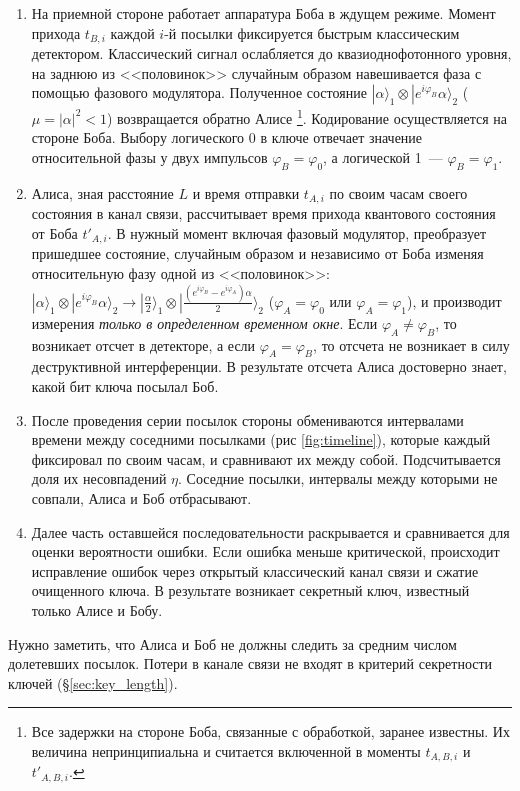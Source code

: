 \begin{enumerate}
  \item На приемной стороне работает аппаратура Боба в ждущем режиме. Момент прихода $t_{B,i}$ каждой $i$-й посылки фиксируется быстрым классическим детектором. 
  Классический сигнал ослабляется до квазиоднофотонного уровня, на заднюю из <<половинок>> случайным образом навешивается фаза с помощью фазового модулятора. 
  Полученное состояние $|\alpha\rangle_1 \otimes |e^{i\varphi_B}\alpha\rangle_2$ ($\mu = |\alpha|^2 < 1$) возвращается обратно Алисе 
  \footnote{Все задержки на стороне Боба, связанные с обработкой, заранее известны. Их величина непринципиальна и считается включенной в моменты $t_{A,B,i}$ и $t'_{A,B,i}$.}. 
  Кодирование осуществляется на стороне Боба.
  Выбору логического 0 в ключе отвечает значение относительной фазы у двух импульсов $\varphi_B = \varphi_0$, а логической 1~--- $\varphi_B = \varphi_1$.   
  
  \item Алиса, зная расстояние $L$ и время отправки $t_{A,i}$ по своим часам своего состояния в канал связи, рассчитывает время прихода квантового состояния от Боба $t'_{A,i}$.
  В нужный момент включая фазовый модулятор, преобразует пришедшее состояние, случайным образом и независимо от Боба изменяя относительную фазу одной из <<половинок>>: 
  $|\alpha\rangle_1 \otimes |e^{i\varphi_B}\alpha\rangle_2 \rightarrow |\frac{\alpha}{2}\rangle_1 \otimes |\frac{(e^{i\varphi_B} - e^{i\varphi_A})\alpha}{2}\rangle_2$
  ($\varphi_A = \varphi_0$ или $\varphi_A = \varphi_1$), и производит измерения \textit{только в определенном временном окне}. 
  Если $\varphi_A \neq \varphi_B$, то возникает отсчет в детекторе, а если $\varphi_A = \varphi_B$, то отсчета не возникает в силу деструктивной интерференции. В результате отсчета Алиса достоверно знает, какой бит ключа посылал Боб.
  
  \item После проведения серии посылок стороны обмениваются интервалами времени между соседними посылками (рис \ref{fig:timeline}), которые каждый фиксировал по своим часам, и сравнивают их между собой. Подсчитывается доля их несовпадений $\eta$. Соседние посылки, интервалы между которыми не совпали, Алиса и Боб отбрасывают.
  
  \item Далее часть оставшейся последовательности раскрывается и сравнивается для оценки вероятности ошибки. Если ошибка меньше критической, происходит исправление ошибок через открытый классический канал связи и сжатие очищенного ключа. В результате возникает секретный ключ, известный только Алисе и Бобу.
\end{enumerate}

Нужно заметить, что Алиса и Боб не должны следить за средним числом долетевших посылок. Потери в канале связи не входят в критерий секретности ключей (\S\ref{sec:key_length}).
